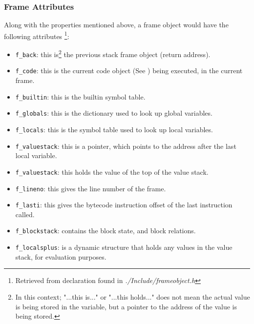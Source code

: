 \documentclass[12pt, a4paper]{report}
\theoremstyle{definition}
\theoremstyle{definition}%
\theoremstyle{definition}%
\theoremstyle{definition}%
\theoremstyle{definition}%
\theoremstyle{definition}%
\begin{document}
{            \subsubsection*{Frame Attributes}
            \par Along with the properties mentioned above, a frame object would have the following attributes \footnote{Retrieved from declaration found in \textit{./Include/frameobject.h}}:
            \begin{itemize}
                \item \lstinline|f_back|: this is\footnote{\label{footnote:frame_obj_attribs}In this context; "...this is..." or "...this holds..." does not mean the actual value is being stored in the variable, but a pointer to the address of the value is being stored.} the previous stack frame object (return address).
                \item \lstinline|f_code|: this is the current code object (See {\bfseries{}}) being executed, in the current frame.
                \item \lstinline|f_builtin|: this is the builtin symbol table.
                \item \lstinline|f_globals|: this is the dictionary used to look up global variables.
                \item \lstinline|f_locals|: this is the symbol table used to look up local variables.
                \item \lstinline|f_valuestack|: this is a pointer, which points to the address after the last local variable.
                \item \lstinline|f_valuestack|: this holds the value of the top of the value stack.
                \item \lstinline|f_lineno|: this gives the line number of the frame.
                \item \lstinline|f_lasti|: this gives the bytecode instruction offset of the last instruction called.
                \item \lstinline|f_blockstack|: contains the block state, and block relations.
                \item \lstinline|f_localsplus|: is a dynamic structure that holds any values in the value stack, for evaluation purposes.
            \end{itemize}

}
\end{document}
